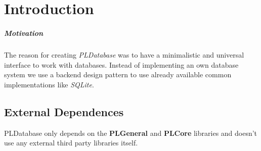 \chapter{Introduction}


\paragraph{Motivation}
The reason for creating \emph{PLDatabase} was to have a minimalistic and universal interface to work with databases. Instead of implementing an own database system we use a backend design pattern to use already available common implementations like \emph{SQLite}.


\section{External Dependences}
PLDatabase only depends on the \textbf{PLGeneral} and \textbf{PLCore} libraries and doesn't use any external third party libraries itself.

